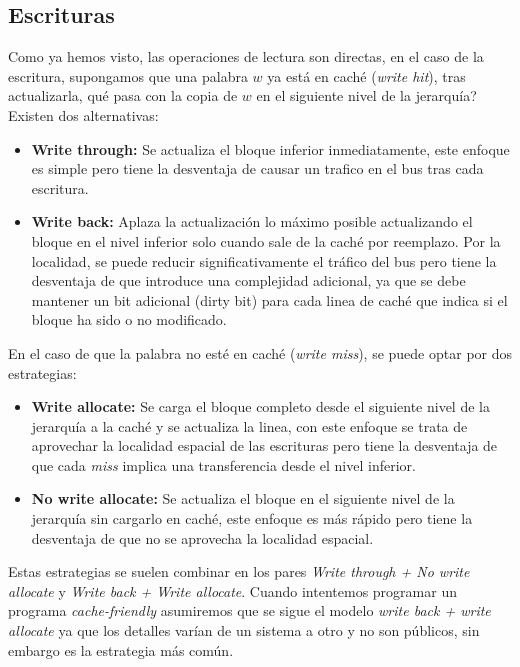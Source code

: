\subsection{Escrituras}
Como ya hemos visto, las operaciones de lectura son directas, en el caso de la escritura, supongamos
que una palabra $w$ ya está en caché (\textit{write hit}), tras actualizarla, qué pasa con la copia de $w$ en el 
siguiente nivel de la jerarquía? Existen dos alternativas:
\begin{itemize}
    \item \textbf{Write through:} Se actualiza el bloque inferior inmediatamente, este enfoque es simple pero tiene 
        la desventaja de causar un trafico en el bus tras cada escritura.
    \item \textbf{Write back:} Aplaza la actualización lo máximo posible actualizando el bloque en el nivel inferior solo cuando
        sale de la caché por reemplazo. Por la localidad, se puede reducir significativamente el tráfico del bus pero tiene la desventaja de
        que introduce una complejidad adicional, ya que se debe mantener un bit adicional (dirty bit) para cada linea de caché que indica si 
        el bloque ha sido o no modificado.
\end{itemize}
En el caso de que la palabra no esté en caché (\textit{write miss}), se puede optar por dos estrategias:
\begin{itemize}
    \item \textbf{Write allocate:} Se carga el bloque completo desde el siguiente nivel de la 
        jerarquía a la caché y se actualiza la linea, con este enfoque se trata de aprovechar 
        la localidad espacial de las escrituras pero tiene la desventaja de que cada \textit{miss}
        implica una transferencia desde el nivel inferior.
    \item \textbf{No write allocate:} Se actualiza el bloque en el siguiente nivel de la jerarquía sin cargarlo en caché, 
        este enfoque es más rápido pero tiene la desventaja de que no se aprovecha la localidad espacial.
\end{itemize}
Estas estrategias se suelen combinar en los pares \textit{Write through + No write allocate} y \textit{Write back + Write allocate}.
Cuando intentemos programar un programa \textit{cache-friendly} asumiremos que se sigue el modelo \textit{write back + write allocate} ya 
que los detalles varían de un sistema a otro y no son públicos, sin embargo es la estrategia más común.
